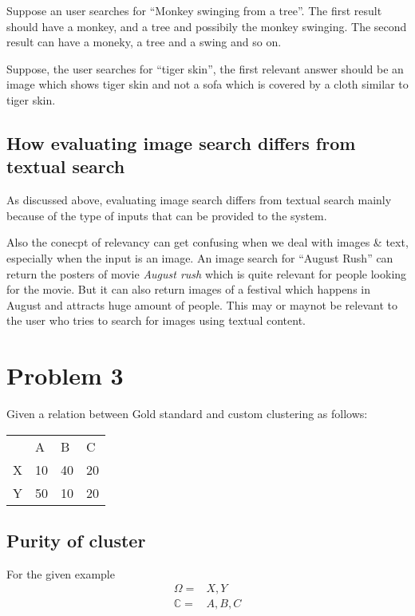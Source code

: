 \documentclass{article}
\begin{document}
Suppose an user searches for ``Monkey swinging from a tree''.  The first result should have a monkey, and a tree and possibily the monkey swinging.  The second result can have a moneky, a tree and a swing and so on.

Suppose, the user searches for ``tiger skin'', the first relevant answer should be an image which shows tiger skin and not a sofa which is covered by a cloth similar to tiger skin.

\subsection{How evaluating image search differs from textual search}
As discussed above, evaluating image search differs from textual search mainly because of the type of inputs that can be provided to the system.

Also the conecpt of relevancy can get confusing when we deal with images \& text, especially when the input is an image.  An image search for ``August Rush'' can return the posters of movie \textit{August rush} which is quite relevant for people looking for the movie.  But it can also return images of a festival which happens in August and attracts huge amount of people.  This may or maynot be relevant to the user who tries to search for images using textual content.

\section{Problem 3}
Given a relation between Gold standard and custom clustering as follows:
\begin{center}
  \begin{tabular}{llll}
      & A & B & C \\
    X & 10 & 40 & 20 \\
    Y & 50 & 10 & 20 \\
  \end{tabular}
\end{center}

\subsection{Purity of cluster}

For the given example 
\begin{align*}
  \Omega = & {X, Y} \\
  \mathbb{C} = & {A, B, C}
\end{align*}
\end{document}
